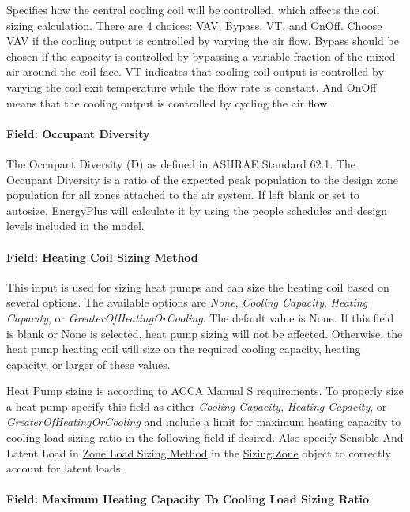 Specifies how the central cooling coil will be controlled, which affects the coil sizing calculation. There are 4 choices: VAV, Bypass, VT, and OnOff. Choose VAV if the cooling output is controlled by varying the air flow. Bypass should be chosen if the capacity is controlled by bypassing a variable fraction of the mixed air around the coil face. VT indicates that cooling coil output is controlled by varying the coil exit temperature while the flow rate is constant. And OnOff means that the cooling output is controlled by cycling the air flow.

\paragraph{Field: Occupant Diversity}\label{occupant-diversity}

The Occupant Diversity (D) as defined in ASHRAE Standard 62.1. The Occupant Diversity is a ratio of the expected peak population to the design zone population for all zones attached to the air system. If left blank or set to autosize, EnergyPlus will calculate it by using the people schedules and design levels included in the model.

\paragraph{Field: Heating Coil Sizing Method}\label{field-heating-coil-sizing-method-0102}

This input is used for sizing heat pumps and can size the heating coil based on several options. The available options are \emph{None}, \emph{Cooling Capacity}, \emph{Heating Capacity}, or \emph{GreaterOfHeatingOrCooling}. The default value is None. If this field is blank or None is selected, heat pump sizing will not be affected. Otherwise, the heat pump heating coil will size on the required cooling capacity, heating capacity, or larger of these values.

Heat Pump sizing is according to ACCA Manual S requirements. To properly size a heat pump specify this field as either \emph{Cooling Capacity}, \emph{Heating Capacity}, or \emph{GreaterOfHeatingOrCooling} and include a limit for maximum heating capacity to cooling load sizing ratio in the following field if desired. Also specify Sensible And Latent Load in \hyperref[field-zone-load-sizing-method]{Zone Load Sizing Method} in the \hyperref[sizingzone]{Sizing:Zone} object to correctly account for latent loads.

\paragraph{Field: Maximum Heating Capacity To Cooling Load Sizing Ratio}\label{maximum-heating-capacity-to-cooling-load-sizing-ratio-0102}


